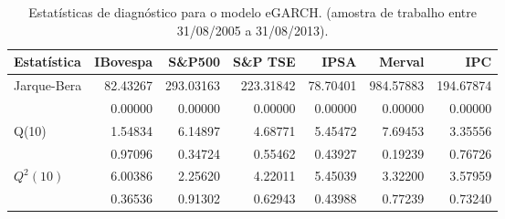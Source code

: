 \begin{table}[H]
\centering
\caption{Estatísticas de diagnóstico para o modelo eGARCH. 
               (amostra de trabalho entre 31/08/2005 a 31/08/2013).} 
\label{tab:garchstats}
\begin{tabular}{lrrrrrr}
  \hline
Estatística & IBovespa & S\&P500 & S\&P TSE & IPSA & Merval & IPC \\ 
  \hline
Jarque-Bera & 82.43267 & 293.03163 & 223.31842 & 78.70401 & 984.57883 & 194.67874 \\ 
   & 0.00000 & 0.00000 & 0.00000 & 0.00000 & 0.00000 & 0.00000 \\ 
  Q(10) & 1.54834 & 6.14897 & 4.68771 & 5.45472 & 7.69453 & 3.35556 \\ 
   & 0.97096 & 0.34724 & 0.55462 & 0.43927 & 0.19239 & 0.76726 \\ 
  $Q^2(10)$ & 6.00386 & 2.25620 & 4.22011 & 5.45039 & 3.32200 & 3.57959 \\ 
   & 0.36536 & 0.91302 & 0.62943 & 0.43988 & 0.77239 & 0.73240 \\ 
   \hline
\end{tabular}
\end{table}
